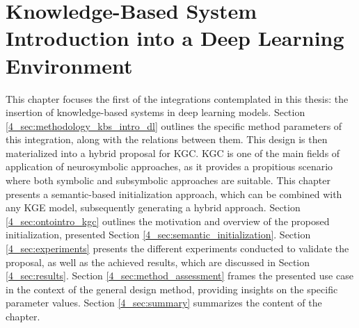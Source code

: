 \chapter{Knowledge-Based System Introduction into a Deep Learning Environment}\label{chap:kbsintegrationdl}

This chapter focuses the first of the integrations contemplated in this thesis: the insertion of knowledge-based systems in deep learning models. Section \ref{4_sec:methodology_kbs_intro_dl} outlines the specific method parameters of this integration, along with the relations between them. This design is then materialized into a hybrid proposal for KGC. KGC is one of the main fields of application of neurosymbolic approaches, as it provides a propitious scenario where both symbolic and subsymbolic approaches are suitable. This chapter presents a semantic-based initialization approach, which can be combined with any KGE model, subsequently generating a hybrid approach. Section \ref{4_sec:ontointro_kgc} outlines the motivation and overview of the proposed initialization, presented Section \ref{4_sec:semantic_initialization}. Section \ref{4_sec:experiments} presents the different experiments conducted to validate the proposal, as well as the achieved results, which are discussed in Section \ref{4_sec:results}. Section \ref{4_sec:method_assessment} frames the presented use case in the context of the general design method, providing insights on the specific parameter values. Section \ref{4_sec:summary} summarizes the content of the chapter. 

